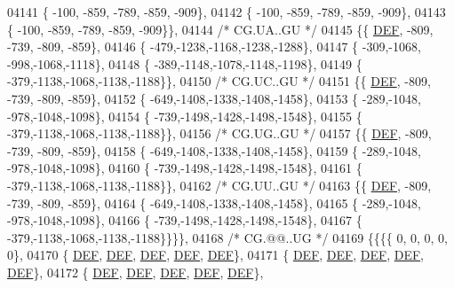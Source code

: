 \begin{DoxyCode}
04141 \{ -100, -859, -789, -859, -909\},
04142 \{ -100, -859, -789, -859, -909\},
04143 \{ -100, -859, -789, -859, -909\}\},
04144 \textcolor{comment}{/* CG.UA..GU */}
04145 \{\{  \mbox{\hyperlink{1_88_84__epars_8h_a397419fc12b37ed479c8abb9d444d843}{DEF}}, -809, -739, -809, -859\},
04146 \{ -479,-1238,-1168,-1238,-1288\},
04147 \{ -309,-1068, -998,-1068,-1118\},
04148 \{ -389,-1148,-1078,-1148,-1198\},
04149 \{ -379,-1138,-1068,-1138,-1188\}\},
04150 \textcolor{comment}{/* CG.UC..GU */}
04151 \{\{  \mbox{\hyperlink{1_88_84__epars_8h_a397419fc12b37ed479c8abb9d444d843}{DEF}}, -809, -739, -809, -859\},
04152 \{ -649,-1408,-1338,-1408,-1458\},
04153 \{ -289,-1048, -978,-1048,-1098\},
04154 \{ -739,-1498,-1428,-1498,-1548\},
04155 \{ -379,-1138,-1068,-1138,-1188\}\},
04156 \textcolor{comment}{/* CG.UG..GU */}
04157 \{\{  \mbox{\hyperlink{1_88_84__epars_8h_a397419fc12b37ed479c8abb9d444d843}{DEF}}, -809, -739, -809, -859\},
04158 \{ -649,-1408,-1338,-1408,-1458\},
04159 \{ -289,-1048, -978,-1048,-1098\},
04160 \{ -739,-1498,-1428,-1498,-1548\},
04161 \{ -379,-1138,-1068,-1138,-1188\}\},
04162 \textcolor{comment}{/* CG.UU..GU */}
04163 \{\{  \mbox{\hyperlink{1_88_84__epars_8h_a397419fc12b37ed479c8abb9d444d843}{DEF}}, -809, -739, -809, -859\},
04164 \{ -649,-1408,-1338,-1408,-1458\},
04165 \{ -289,-1048, -978,-1048,-1098\},
04166 \{ -739,-1498,-1428,-1498,-1548\},
04167 \{ -379,-1138,-1068,-1138,-1188\}\}\}\},
04168 \textcolor{comment}{/* CG.@@..UG */}
04169 \{\{\{\{    0,    0,    0,    0,    0\},
04170 \{  \mbox{\hyperlink{1_88_84__epars_8h_a397419fc12b37ed479c8abb9d444d843}{DEF}},  \mbox{\hyperlink{1_88_84__epars_8h_a397419fc12b37ed479c8abb9d444d843}{DEF}},  \mbox{\hyperlink{1_88_84__epars_8h_a397419fc12b37ed479c8abb9d444d843}{DEF}},  \mbox{\hyperlink{1_88_84__epars_8h_a397419fc12b37ed479c8abb9d444d843}{DEF}},  \mbox{\hyperlink{1_88_84__epars_8h_a397419fc12b37ed479c8abb9d444d843}{DEF}}\},
04171 \{  \mbox{\hyperlink{1_88_84__epars_8h_a397419fc12b37ed479c8abb9d444d843}{DEF}},  \mbox{\hyperlink{1_88_84__epars_8h_a397419fc12b37ed479c8abb9d444d843}{DEF}},  \mbox{\hyperlink{1_88_84__epars_8h_a397419fc12b37ed479c8abb9d444d843}{DEF}},  \mbox{\hyperlink{1_88_84__epars_8h_a397419fc12b37ed479c8abb9d444d843}{DEF}},  \mbox{\hyperlink{1_88_84__epars_8h_a397419fc12b37ed479c8abb9d444d843}{DEF}}\},
04172 \{  \mbox{\hyperlink{1_88_84__epars_8h_a397419fc12b37ed479c8abb9d444d843}{DEF}},  \mbox{\hyperlink{1_88_84__epars_8h_a397419fc12b37ed479c8abb9d444d843}{DEF}},  \mbox{\hyperlink{1_88_84__epars_8h_a397419fc12b37ed479c8abb9d444d843}{DEF}},  \mbox{\hyperlink{1_88_84__epars_8h_a397419fc12b37ed479c8abb9d444d843}{DEF}},  \mbox{\hyperlink{1_88_84__epars_8h_a397419fc12b37ed479c8abb9d444d843}{DEF}}\},

\end{DoxyCode}
